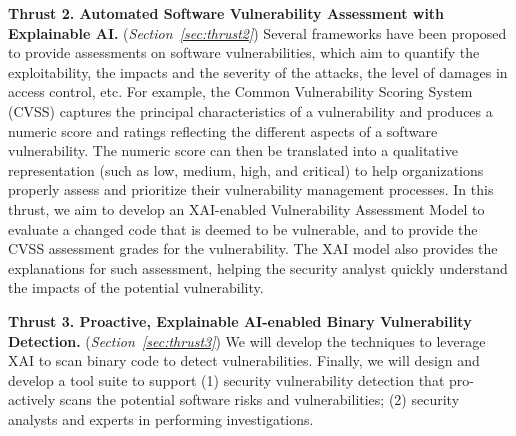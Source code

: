 \vspace{3pt}
\noindent \textbf{Thrust 2. Automated Software Vulnerability
  Assessment with Explainable AI.} ({\em Section~\ref{sec:thrust2}})
Several frameworks have been proposed to provide assessments on
software vulnerabilities, which aim to quantify the exploitability,
the impacts and the severity of the attacks, the level of damages in
access control, etc. For example, the Common Vulnerability Scoring
System (CVSS) captures the principal characteristics of a
vulnerability and produces a numeric score and ratings reflecting
the different aspects of a software vulnerability. The numeric score
can then be translated into a qualitative representation (such as low,
medium, high, and critical) to help organizations properly assess and
prioritize their vulnerability management processes. In this thrust,
we aim to develop an XAI-enabled Vulnerability Assessment Model to
evaluate a changed code that is deemed to be vulnerable, and to
provide the CVSS assessment grades for the vulnerability. The XAI
model also provides the explanations for such assessment, helping the
security analyst quickly understand the impacts of the potential
vulnerability.

\vspace{3pt}
\noindent \textbf{Thrust 3. Proactive, Explainable AI-enabled Binary
  Vulnerability Detection.} ({\em Section~\ref{sec:thrust3}}) We will
develop the techniques to leverage XAI to scan binary code to detect
vulnerabilities. Finally, we will design and develop a tool suite to
support (1)
security vulnerability detection that pro-actively scans the
potential software risks and vulnerabilities; (2) security analysts and
experts in performing investigations.







